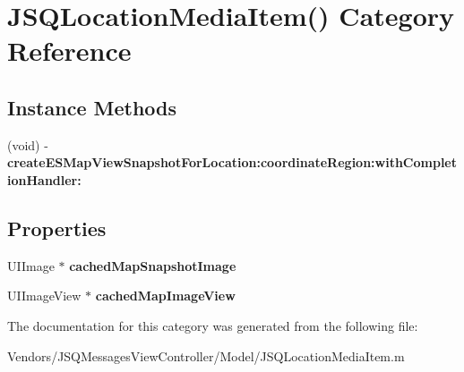 \hypertarget{category_j_s_q_location_media_item_07_08}{}\section{J\+S\+Q\+Location\+Media\+Item() Category Reference}
\label{category_j_s_q_location_media_item_07_08}
\subsection*{Instance Methods}
\begin{DoxyCompactItemize}
\item 
\hypertarget{category_j_s_q_location_media_item_07_08_a32bfd0e6bbdd377f9b4b98639af551e5}{}(void) -\/ {\bfseries create\+E\+S\+Map\+View\+Snapshot\+For\+Location\+:coordinate\+Region\+:with\+Completion\+Handler\+:}\label{category_j_s_q_location_media_item_07_08_a32bfd0e6bbdd377f9b4b98639af551e5}

\end{DoxyCompactItemize}
\subsection*{Properties}
\begin{DoxyCompactItemize}
\item 
\hypertarget{category_j_s_q_location_media_item_07_08_acbde3e07bcfd0999ac2b7e12bfe010ed}{}U\+I\+Image $\ast$ {\bfseries cached\+Map\+Snapshot\+Image}\label{category_j_s_q_location_media_item_07_08_acbde3e07bcfd0999ac2b7e12bfe010ed}

\item 
\hypertarget{category_j_s_q_location_media_item_07_08_a4666c999e715c4e14c3c4d92bf148d35}{}U\+I\+Image\+View $\ast$ {\bfseries cached\+Map\+Image\+View}\label{category_j_s_q_location_media_item_07_08_a4666c999e715c4e14c3c4d92bf148d35}

\end{DoxyCompactItemize}


The documentation for this category was generated from the following file\+:\begin{DoxyCompactItemize}
\item 
Vendors/\+J\+S\+Q\+Messages\+View\+Controller/\+Model/J\+S\+Q\+Location\+Media\+Item.\+m\end{DoxyCompactItemize}
